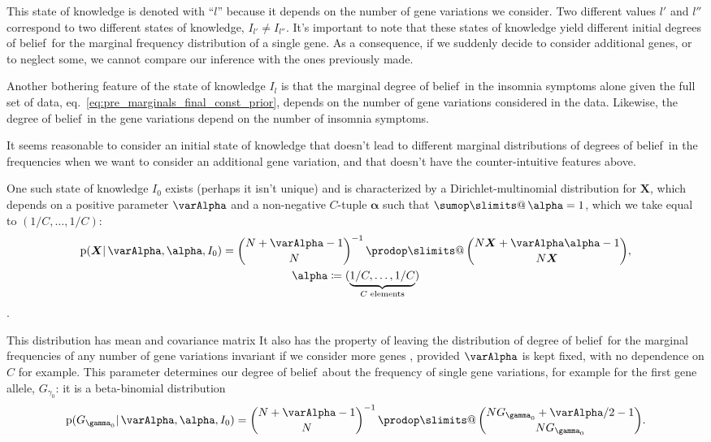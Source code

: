 \documentclass[\ifafour a4paper,12pt,\else a5paper,10pt,\fi%
onecolumn,oneside,article,%
british%
]{memoir}
\makeatletter
\theoremstyle{remark}
\theoremstyle{innote}
\def\sum{\DOTSI\sumop\slimits@}
\def\prod{\DOTSI\prodop\slimits@}
\newcommand*{\citep}{\parencites}
\newcommand*{\defd}{\coloneqq}
\newcommand*{\pf}{\mathrm{p}}%
\renewcommand*{\|}{\mathpunct{|}}
\newcommand*{\sect}{\S}%
\newcommand*{\sects}{\S\S}%
\newcommand*{\eqn}{eq.}%
\newcommand*{\tprod}{\mathop{\textstyle\prod}\nolimits}
\newcommand*{\tsum}{\mathop{\textstyle\sum}\nolimits}
\newcommand*{\E}{\mathrm{E}}
\DeclareMathOperator{\cov}{cov}
\DeclareMathOperator{\diag}{diag}
\newcommand*{\dob}{degree of belief}
\newcommand*{\dobs}{degrees of belief}
\newcommand*{\yI}{I}
\newcommand*{\ysum}{\tsum}
\newcommand*{\yprod}{\tprod}
\newcommand*{\yg}{\gamma}
\newcommand*{\gn}{l}
\newcommand*{\yF}{\bm{X}}
\newcommand*{\yIc}{I_{\gn}}
\newcommand*{\yIo}{I_{0}}
\newcommand*{\yA}{\varAlpha}
\newcommand*{\ya}{\bm{\alpha}}
\makeatother
\begin{document}
This state of knowledge is denoted with \enquote{$\gn$} because it depends
on the number of gene variations we consider. Two different values $\gn'$
and $\gn''$ correspond to two different states of knowledge,
$\yI_{\gn'} \ne \yI_{\gn''}$. It's important to note that these states of
knowledge yield different initial \dobs\ for the marginal frequency
distribution of a single gene. As a consequence, if we suddenly decide to
consider additional genes, or to neglect some, we cannot compare our
inference with the ones previously made.

Another bothering feature of the state of knowledge $\yIc$ is that the
marginal \dob\ in the insomnia symptoms alone given the full set of
data, \eqn~\eqref{eq:pre_marginals_final_const_prior}, depends on the number of
gene variations considered in the data. Likewise, the \dob\ in the
gene variations depend on the number of insomnia symptoms.

It seems reasonable to consider an initial state of knowledge that doesn't
lead to different marginal distributions of \dobs\ in the frequencies when
we want to consider an additional gene variation, and that doesn't have
the counter-intuitive features above.

One such state of knowledge $\yIo$ exists (perhaps it isn't unique) and is
characterized by a Dirichlet-multinomial distribution for $\yF$, which
depends on a positive parameter $\yA$ and a non-negative $C$-tuple $\ya$
such that $\ysum\ya=1$, which we take equal to $(1/C,\dotsc,1/C)$:
\begin{multline}
  \label{eq:pre_dirichlet_prior}
  \pf(\yF \| \yA, \ya,\yIo) =
  \binom{N+\yA-1}{N}^{-1} \yprod\binom{N\yF+\yA\ya-1}{N\yF},\\
  \ya \defd (\underbrace{1/C,\dotsc,1/C}_{\text{$C$ elements}})
\end{multline}
\citep[\sect~13.1]{johnsonetal1969_r1996}[\sect~3]{minka2000_r2012}[and
especially][\sects~3--4]{basuetal1982}.

This distribution has mean and covariance matrix
It also has the property of leaving the distribution of \dob\ for the
marginal frequencies of any number of gene variations invariant if we
consider more genes \citep[\sects~3--4]{basuetal1982}, provided $\yA$ is
kept fixed, with no dependence on $C$ for example. This parameter
determines our \dob\ about the frequency of single gene variations, for
example for the first gene allele, $G_{\yg_0}$: it is a beta-binomial
distribution
\begin{equation}
  \label{eq:pre_dirichlet_prior_marginal_beta-binomial}
  \pf(G_{\yg_0} \| \yA, \ya,\yIo) =
  \binom{N+\yA-1}{N}^{-1} \yprod\binom{N G_{\yg_0}+\yA/2-1}{N G_{\yg_0}}.
\end{equation}
\end{document}
